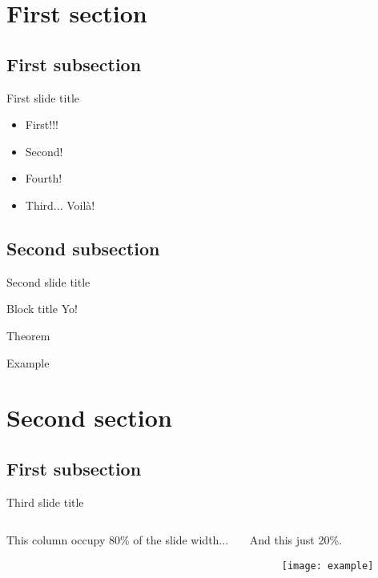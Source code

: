\section{First section}
\subsection{First subsection}

\begin{frame}{First slide title}
	\begin{itemize}
		\item {
			First!!!
			\pause
		}
		\item {
			Second!
		}
		\item<4-> {
			Fourth!
		}
		\item<3-> {
			Third... \uncover<5-> {Voil\`{a}!}
		}
	\end{itemize}
\end{frame}

\subsection{Second subsection}

\begin{frame}{Second slide title}
	\begin{block}{Block title}
		Yo!
	\end{block}
	\begin{theorem}
		Theorem
	\end{theorem}
	\begin{example}
		Example
	\end{example}
\end{frame}

\section{Second section}
\subsection{First subsection}

\begin{frame}{Third slide title}
	\begin{columns}
		\begin{column}{0.8\textwidth} %
			This column occupy 80\% of the slide width...
			\pause
		\end{column}
		\begin{column}{0.2\textwidth}
			And this just 20\%.\\
			\begin{figure}
				\centering
				\texttt{[image: example]}
			\end{figure}
		\end{column}
	\end{columns}
\end{frame}

